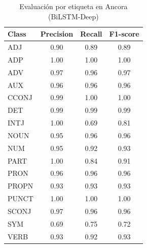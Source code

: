 \begin{table}[H]
\centering
\small
\begin{tabular}{lccc}
\hline
\textbf{Class} & \textbf{Precision} & \textbf{Recall} & \textbf{F1-score} \\
\hline
ADJ   & 0.90 & 0.89 & 0.89 \\
ADP   & 1.00 & 1.00 & 1.00 \\
ADV   & 0.97 & 0.96 & 0.97 \\
AUX   & 0.96 & 0.96 & 0.96 \\
CCONJ & 0.99 & 1.00 & 1.00 \\
DET   & 0.99 & 0.99 & 0.99 \\
INTJ  & 1.00 & 0.69 & 0.81 \\
NOUN  & 0.95 & 0.96 & 0.96 \\
NUM   & 0.95 & 0.92 & 0.93 \\
PART  & 1.00 & 0.84 & 0.91 \\
PRON  & 0.96 & 0.96 & 0.96 \\
PROPN & 0.93 & 0.93 & 0.93 \\
PUNCT & 1.00 & 1.00 & 1.00 \\
SCONJ & 0.97 & 0.96 & 0.96 \\
SYM   & 0.69 & 0.75 & 0.72 \\
VERB  & 0.93 & 0.92 & 0.93 \\
\hline
\end{tabular}
\caption{Evaluación por etiqueta en Ancora (BiLSTM-Deep)}
\end{table}
